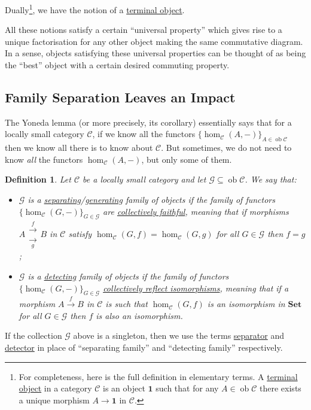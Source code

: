\documentclass[a4paper,11pt]{article}
\theoremstyle{break_italics}
\newtheorem*{definition*}{Definition}
\theoremstyle{break_upright}
\theoremstyle{remark}
\newcommand{\ob}{\operatorname{ob}}
\newcommand{\C}{\mathcal{C}}
\newcommand{\Set}{\mathbf{Set}}
\begin{document}
Dually\footnote{For completeness, here is the full definition in elementary terms. A \uline{terminal object} in a category $\C$ is an object $\mathbf 1$ such that for any $A \in \ob\C$ there exists a unique morphism $A \rightarrow \mathbf 1$ in $\C$.}, we have the notion of a \uline{terminal object}.

All these notions satisfy a certain ``universal property'' which gives rise to a unique factorisation for any other object making the same commutative diagram. In a sense, objects satisfying these universal properties can be thought of as being the ``best'' object with a certain desired commuting property.




\subsection{Family Separation Leaves an Impact}

The Yoneda lemma (or more precisely, its corollary) essentially says that for a locally small category $\C$, if we know all the functors $\{\hom_\C(A, -)\}_{A\in\ob\C}$ then we know all there is to know about $\C$. But sometimes, we do not need to know \textit{all} the functors $\hom_\C(A,-)$, but only some of them.

\begin{definition*}
	Let $\C$ be a locally small category and let $\mathcal G \subseteq \ob\C$. We say that:
	\begin{itemize}
		\item $\mathcal G$ is a \uline{separating}/\uline{generating} family of objects if the family of functors $\{\hom_\C(G, -)\}_{G \in \mathcal G}$ are \uline{collectively faithful}, meaning that if morphisms $A \substack{\xrightarrow{f} \\ \xrightarrow[g]{}} B$ in $\C$ satisfy $\hom_\C(G, f) = \hom_\C(G, g)$ for all $G \in \mathcal G$ then $f = g$;
		\item $\mathcal G$ is a \uline{detecting} family of objects if the family of functors $\{\hom_\C(G,-)\}_{G \in \mathcal G}$ \uline{collectively reflect isomorphisms}, meaning that if a morphism $A \xrightarrow{f} B$ in $\C$ is such that $\hom_\C(G, f)$ is an isomorphism in $\Set$ for all $G \in \mathcal G$ then $f$ is also an isomorphism.
	\end{itemize}
\end{definition*}

If the collection $\mathcal G$ above is a singleton, then we use the terms \uline{separator} and \uline{detector} in place of ``separating family'' and ``detecting family'' respectively.
\end{document}
